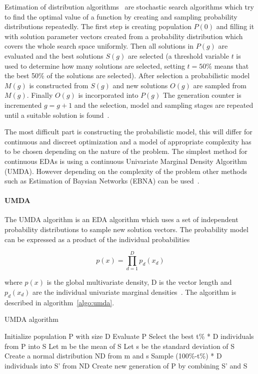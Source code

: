Estimation of distribution algorithms~\cite{Hauschild2011111} are stochastic search algorithms which try to find the optimal value of a function by creating and sampling probability distributions repeatedly. The first step is creating population $P(0)$ and filling it with solution parameter vectors created from a probability distribution which covers the whole search space uniformly. Then all solutions in $P(g)$ are evaluated and the best solutions $S(g)$ are selected (a threshold variable $t$ is used to determine how many solutions are selected, setting $t=50\%$ means that the best 50\% of the solutions are selected). After selection a probabilistic model $M(g)$ is constructed from $S(g)$ and new solutions $O(g)$ are sampled from $M(g)$. Finally $O(g)$ is incorporated into $P(g)$ The generation counter is incremented $g = g + 1$ and the selection, model and sampling stages are repeated until a suitable solution is found~\cite{Hauschild2011111}.

The most difficult part is constructing the probabilistic model, this will differ for continuous and discreet optimization and a model of appropriate complexity has to be chosen depending on the nature of the problem. The simplest method for continuous EDAs is using a continuous Univariate Marginal Density Algorithm (UMDA). However depending on the complexity of the problem other methods such as Estimation of Baysian Networks (EBNA) can be used~\cite{larranaga2012review}.

\paragraph{UMDA}
The UMDA algorithm is an EDA algorithm which uses a set of independent probability distributions to sample new solution vectors. The probability model can be expressed as a product of the individual probabilities

\begin{equation}
  p(x) = \prod _{d=1}^D {p_d(x_d)}
\end{equation}

where $p(x)$ is the global multivariate density, D is the vector length and $p_d(x_d)$ are the individual univariate marginal densities~\cite{povsik2004estimation}. The algorithm is described in algorithm~\ref{algo:umda}.

\begin{algorithm}[h]
  \caption{UMDA algorithm}
  \label{algo:umda}

    \begin{algorithmic}
      \State Initialize population P with size D
      \Repeat
        \State Evaluate P
        \State Select the best t\% * D individuals from P into S
        \State Let m be the mean of S
        \State Let s be the standard deviation of S
        \State Create a normal distribution ND from m and s
        \State Sample (100\%-t\%) * D individuals into S' from ND
        \State Create new generation of P by combining S' and S
    \end{algorithmic}

\end{algorithm}

